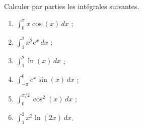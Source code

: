 
\begin{exercice}\label{exomazhe-0012}

Calculer par parties les intégrales suivantes.
\begin{multicols}{3}
  \begin{enumerate}
  \item $\displaystyle \int_0^\pi x\cos(x)\, dx $ ;
  \item $\displaystyle \int_1^2 x^{2}e^x \, dx $ ;
  \item $\displaystyle \int_1^2 \ln(x) \, dx $ ;
  \item $\displaystyle \int_{-\pi}^{0} e^x\sin(x) \, dx $ ;
  \item $\displaystyle \int_{0}^{\pi/2} \cos^2(x) \, dx$ ;
  \item $\displaystyle \int_{1}^{2} x^2\ln(2x) \, dx$.
  \end{enumerate}
\end{multicols}

\end{exercice}
